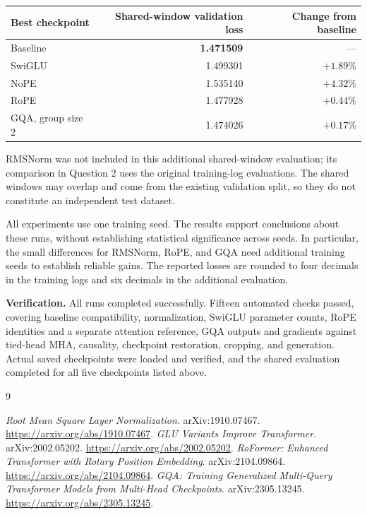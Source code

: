 \documentclass[10pt]{article}
\begin{document}
\begin{center}
\begin{tabular}{@{}lrr@{}}
\toprule
Best checkpoint & Shared-window validation loss & Change from baseline \\
\midrule
Baseline & \textbf{1.471509} & --- \\
SwiGLU & 1.499301 & $+1.89\%$ \\
NoPE & 1.535140 & $+4.32\%$ \\
RoPE & 1.477928 & $+0.44\%$ \\
GQA, group size 2 & 1.474026 & $+0.17\%$ \\
\bottomrule
\end{tabular}
\end{center}

RMSNorm was not included in this additional shared-window evaluation; its
comparison in Question 2 uses the original training-log evaluations. The shared
windows may overlap and come from the existing validation split, so they do not
constitute an independent test dataset.

All experiments use one training seed. The results support conclusions about
these runs, without establishing statistical significance across seeds. In
particular, the small differences for RMSNorm, RoPE, and GQA need additional
training seeds to establish reliable gains. The reported losses are rounded to
four decimals in the training logs and six decimals in the additional evaluation.

\textbf{Verification.} All runs completed successfully. Fifteen automated checks
passed, covering baseline compatibility, normalization, SwiGLU parameter counts,
RoPE identities and a separate attention reference, GQA outputs and gradients
against tied-head MHA, causality, checkpoint restoration, cropping, and generation.
Actual saved checkpoints were loaded and verified, and the shared evaluation
completed for all five checkpoints listed above.

\begin{thebibliography}{9}
\raggedright
{}
\emph{Root Mean Square Layer Normalization}. arXiv:1910.07467.
\url{https://arxiv.org/abs/1910.07467}.
\emph{GLU Variants Improve Transformer}. arXiv:2002.05202.
\url{https://arxiv.org/abs/2002.05202}.
\emph{RoFormer: Enhanced Transformer with Rotary Position Embedding}.
arXiv:2104.09864. \url{https://arxiv.org/abs/2104.09864}.
\emph{GQA: Training Generalized Multi-Query Transformer Models from Multi-Head
Checkpoints}. arXiv:2305.13245. \url{https://arxiv.org/abs/2305.13245}.
\end{thebibliography}
\end{document}
